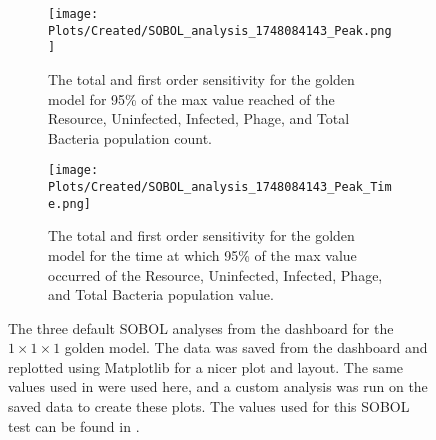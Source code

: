 \begin{figure}
    \centering
    \begin{subfigure}{0.49\linewidth}
        \centering
        \captionsetup{width=1\linewidth}
        \texttt{[image: Plots/Created/SOBOL\_analysis\_1748084143\_Peak.png]}
        \caption{
            The total and first order sensitivity for the golden model for 95\% of the max value reached of the Resource, Uninfected, Infected, Phage, and Total Bacteria population count. 
        }
        \label{fig:created:SOBOL_peak}
    \end{subfigure}
    \hfill
    \begin{subfigure}{0.49\linewidth}
        \centering
        \captionsetup{width=1\linewidth}
        \texttt{[image: Plots/Created/SOBOL\_analysis\_1748084143\_Peak\_Time.png]}
        \caption{
            The total and first order sensitivity for the golden model for the time at which 95\% of the max value occurred of the Resource, Uninfected, Infected, Phage, and Total Bacteria population value. 
        }
        \label{fig:created:SOBOL_peak_time}
        \end{subfigure}
    \caption{
        The three default SOBOL analyses from the dashboard for the $1\times 1 \times 1$ golden model. 
        The data was saved from the dashboard and replotted using Matplotlib for a nicer plot and layout. 
        The same values used in  were used here, and a custom analysis was run on the saved data to create these plots. 
        The values used for this SOBOL test can be found in . 
    }
    \label{fig:created:SOBOL_custom}
\end{figure}
